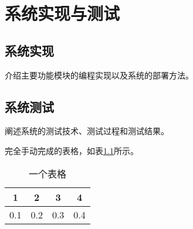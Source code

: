 

\chapter{系统实现与测试}

\section{系统实现}
介绍主要功能模块的编程实现以及系统的部署方法。

\section{系统测试}
阐述系统的测试技术、测试过程和测试结果。




完全手动完成的表格，如表\ref{tab:tab1}所示。 %
\begin{table}[H] %
    \centering  %
    \caption{一个表格}  %
    \label{tab:tab1}  %
    \begin{tabular}{|c|c|c|c|}   
        \hline  %
        1 & 2 & 3 & 4 \\  %
        \hline 
        0.1 & 0.2 & 0.3 & 0.4 \\
        \hline
    \end{tabular}
\end{table}

